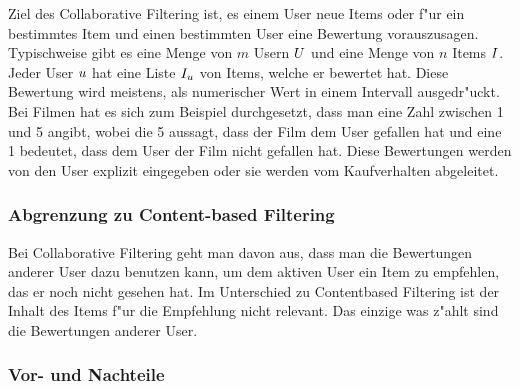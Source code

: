\documentclass[a4paper, 12pt]{article}
\begin{document}
Ziel des Collaborative Filtering ist, es einem User neue Items oder f"ur ein bestimmtes Item und einen bestimmten User eine Bewertung vorauszusagen. Typischweise gibt es eine Menge von $m$ Usern  $\mathnormal{U}$ und eine Menge von $n$ Items $\mathnormal{I}$. Jeder User $\mathnormal{u}$ hat eine Liste $\mathnormal{I_u}$ von Items, welche er bewertet hat. Diese Bewertung wird meistens, als numerischer Wert in einem Intervall ausgedr"uckt. Bei Filmen hat es sich zum Beispiel durchgesetzt, dass man eine Zahl zwischen 1 und 5 angibt, wobei die 5 aussagt, dass der Film dem User gefallen hat und eine 1 bedeutet, dass dem User der Film nicht gefallen hat. Diese Bewertungen werden von den User explizit eingegeben oder sie werden vom Kaufverhalten abgeleitet.

\subsubsection{Abgrenzung zu Content-based Filtering}
\label{sec:definitioncf}

Bei Collaborative Filtering geht man davon aus, dass man die Bewertungen anderer User dazu benutzen kann, um dem aktiven User ein Item zu empfehlen, das er noch nicht gesehen hat. Im Unterschied zu Contentbased Filtering ist der Inhalt des Items f"ur die Empfehlung nicht relevant. Das einzige was z"ahlt sind die Bewertungen anderer User.

\subsubsection{Vor- und Nachteile}
\label{sec:advandage}
\end{document}
